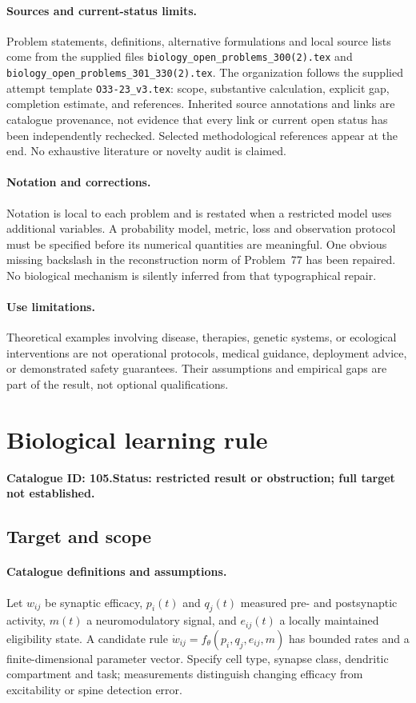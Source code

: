 \documentclass[11pt]{article}
\begin{document}
\paragraph{Sources and current-status limits.}
Problem statements, definitions, alternative formulations and local source lists
come from the supplied files
\texttt{biology\_open\_problems\_300(2).tex} and
\texttt{biology\_open\_problems\_301\_330(2).tex}.
The organization follows the supplied attempt template
\texttt{O33-23\_v3.tex}: scope, substantive calculation, explicit gap,
completion estimate, and references. Inherited source annotations and links are
catalogue provenance, not evidence that every link or current open status has
been independently rechecked. Selected methodological references appear at the
end. No exhaustive literature or novelty audit is claimed.

\paragraph{Notation and corrections.}
Notation is local to each problem and is restated when a restricted model uses
additional variables. A probability model, metric, loss and observation protocol
must be specified before its numerical quantities are meaningful. One obvious
missing backslash in the reconstruction norm of Problem~77 has been repaired.
No biological mechanism is silently inferred from that typographical repair.

\paragraph{Use limitations.}
Theoretical examples involving disease, therapies, genetic systems, or ecological
interventions are not operational protocols, medical guidance, deployment advice,
or demonstrated safety guarantees. Their assumptions and empirical gaps are part
of the result, not optional qualifications.

\setcounter{section}{104}
\section{Biological learning rule}
\label{prob:105}
\noindent\textbf{Catalogue ID: 105.}\quad \textbf{Status: restricted result or obstruction; full target not established.}
\subsection{Target and scope}
\paragraph{Catalogue definitions and assumptions.}
Let $w_{ij}$ be synaptic efficacy, $p_i(t)$ and $q_j(t)$ measured pre- and postsynaptic activity, $m(t)$ a neuromodulatory signal, and $e_{ij}(t)$ a locally maintained eligibility state. A candidate rule $\dot w_{ij}=f_\theta(p_i,q_j,e_{ij},m)$ has bounded rates and a finite-dimensional parameter vector. Specify cell type, synapse class, dendritic compartment and task; measurements distinguish changing efficacy from excitability or spine detection error.
\end{document}
